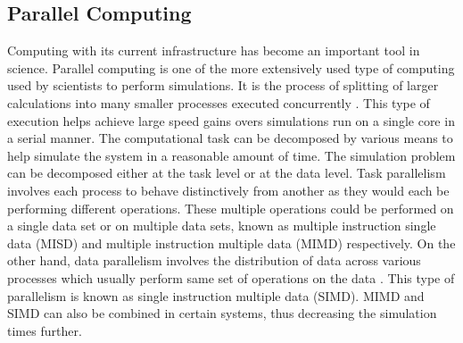 \documentclass[preprint,10pt,authoryear,review]{elsarticle}
\begin{document}





\subsection{Parallel Computing}
Computing with its current infrastructure has become an important tool in science. 
Parallel computing is one of the more extensively used type of computing used by scientists 
to perform simulations. It is the process of splitting of larger calculations into 
many smaller processes executed concurrently \citep{Almasi1989}. This type of execution 
helps achieve large speed gains overs simulations run on a single core in a serial manner.
The computational task can be decomposed by various means to help simulate the system 
in a reasonable amount of time. The simulation problem can be decomposed either 
at the task level or at the data level. Task parallelism involves each process to 
behave distinctively from another as they would each be performing different operations. 
These multiple operations could be performed on a single data set or on multiple data 
sets, known as multiple instruction single data (MISD) and multiple instruction 
multiple data (MIMD) respectively. On the other hand, data parallelism 
involves the distribution of data across various processes which usually perform same set of 
operations on the data \citep{solihin2015}. This type of parallelism is known 
as single instruction multiple data (SIMD). MIMD and SIMD can also 
be combined in certain systems, thus decreasing the simulation times further.
\end{document}
